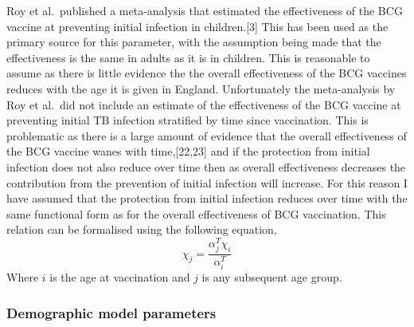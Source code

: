 \documentclass[11pt,twoside]{bristolthesis}
\begin{document}
  Roy et al.~published a meta-analysis that estimated the effectiveness of the BCG vaccine at preventing initial infection in children.{[}3{]} This has been used as the primary source for this parameter, with the assumption being made that the effectiveness is the same in adults as it is in children. This is reasonable to assume as there is little evidence the the overall effectiveness of the BCG vaccines reduces with the age it is given in England. Unfortunately the meta-analysis by Roy et al.~did not include an estimate of the effectiveness of the BCG vaccine at preventing initial TB infection stratified by time since vaccination. This is problematic as there is a large amount of evidence that the overall effectiveness of the BCG vaccine wanes with time,{[}22,23{]} and if the protection from initial infection does not also reduce over time then as overall effectiveness decreases the contribution from the prevention of initial infection will increase. For this reason I have assumed that the protection from initial infection reduces over time with the same functional form as for the overall effectiveness of BCG vaccination. This relation can be formalised using the following equation,
  \begin{equation}
    \chi_j = \frac{\alpha^T_j\chi_i}{\alpha^T_i}
    \label{eq:fun-prev-initial-inf}
  \end{equation}
  Where \(i\) is the age at vaccination and \(j\) is any subsequent age group.
  
  \hypertarget{demographic-model-parameters}{%
  \subsubsection{Demographic model parameters}\label{demographic-model-parameters}}
  
\end{document}
